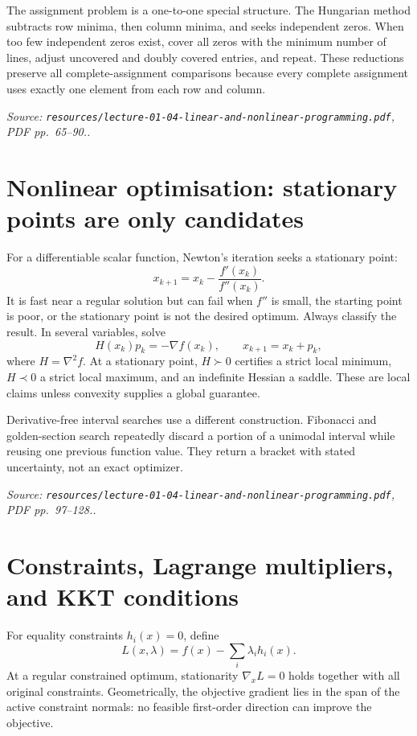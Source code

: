 \documentclass[11pt,a4paper]{article}
\renewcommand{\texttt}[1]{\nolinkurl{#1}}
\newcommand{\source}[1]{\par\smallskip\noindent\textit{Source: #1.}\par\smallskip}
\begin{document}
The assignment problem is a one-to-one special structure. The Hungarian method subtracts row minima, then column minima, and seeks independent zeros. When too few independent zeros exist, cover all zeros with the minimum number of lines, adjust uncovered and doubly covered entries, and repeat. These reductions preserve all complete-assignment comparisons because every complete assignment uses exactly one element from each row and column.
\source{\texttt{resources/lecture-01-04-linear-and-nonlinear-programming.pdf}, PDF pp.~65--90.}

\section{Nonlinear optimisation: stationary points are only candidates}
For a differentiable scalar function, Newton's iteration seeks a stationary point:
\[
 x_{k+1}=x_k-\frac{f'(x_k)}{f''(x_k)}.
\]
It is fast near a regular solution but can fail when $f''$ is small, the starting point is poor, or the stationary point is not the desired optimum. Always classify the result. In several variables, solve
\[
 H(x_k)p_k=-\nabla f(x_k),\qquad x_{k+1}=x_k+p_k,
\]
where $H=\nabla^2f$. At a stationary point, $H\succ0$ certifies a strict local minimum, $H\prec0$ a strict local maximum, and an indefinite Hessian a saddle. These are local claims unless convexity supplies a global guarantee.

Derivative-free interval searches use a different construction. Fibonacci and golden-section search repeatedly discard a portion of a unimodal interval while reusing one previous function value. They return a bracket with stated uncertainty, not an exact optimizer.
\source{\texttt{resources/lecture-01-04-linear-and-nonlinear-programming.pdf}, PDF pp.~97--128.}

\section{Constraints, Lagrange multipliers, and KKT conditions}
For equality constraints $h_i(x)=0$, define
\[
 L(x,\lambda)=f(x)-\sum_i\lambda_i h_i(x).
\]
At a regular constrained optimum, stationarity $\nabla_xL=0$ holds together with all original constraints. Geometrically, the objective gradient lies in the span of the active constraint normals: no feasible first-order direction can improve the objective.
\end{document}

